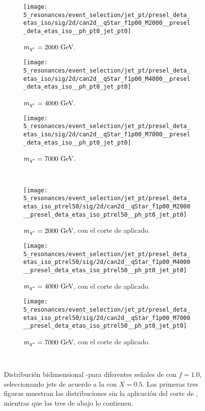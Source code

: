\begin{figure}[ht!]
    \centering
    \begin{subfigure}[h]{0.32\linewidth}
        \centering
        \texttt{[image: 5\_resonances/event\_selection/jet\_pt/presel\_deta\_etas\_iso/sig/2d/can2d\_\_qStar\_f1p00\_M2000\_\_presel\_deta\_etas\_iso\_\_ph\_pt0\_jet\_pt0]}
        \caption{\(m_{q^*}=2000~\text{GeV}\).}
    \end{subfigure}
    \hfill
    \begin{subfigure}[h]{0.32\linewidth}
        \centering
        \texttt{[image: 5\_resonances/event\_selection/jet\_pt/presel\_deta\_etas\_iso/sig/2d/can2d\_\_qStar\_f1p00\_M4000\_\_presel\_deta\_etas\_iso\_\_ph\_pt0\_jet\_pt0]}
        \caption{\(m_{q^*}=4000~\text{GeV}\).}
    \end{subfigure}
    \hfill
    \begin{subfigure}[h]{0.32\linewidth}
        \centering
        \texttt{[image: 5\_resonances/event\_selection/jet\_pt/presel\_deta\_etas\_iso/sig/2d/can2d\_\_qStar\_f1p00\_M7000\_\_presel\_deta\_etas\_iso\_\_ph\_pt0\_jet\_pt0]}
        \caption{\(m_{q^*}=7000~\text{GeV}\).}
    \end{subfigure}\\
    \begin{subfigure}[h]{0.32\linewidth}
        \centering
        \texttt{[image: 5\_resonances/event\_selection/jet\_pt/presel\_deta\_etas\_iso\_ptrel50/sig/2d/can2d\_\_qStar\_f1p00\_M2000\_\_presel\_deta\_etas\_iso\_ptrel50\_\_ph\_pt0\_jet\_pt0]}
        \caption{\(m_{q^*}=2000~\text{GeV}\), con el corte de \ptjet aplicado.}
    \end{subfigure}
    \hfill
    \begin{subfigure}[h]{0.32\linewidth}
        \centering
        \texttt{[image: 5\_resonances/event\_selection/jet\_pt/presel\_deta\_etas\_iso\_ptrel50/sig/2d/can2d\_\_qStar\_f1p00\_M4000\_\_presel\_deta\_etas\_iso\_ptrel50\_\_ph\_pt0\_jet\_pt0]}
        \caption{\(m_{q^*}=4000~\text{GeV}\), con el corte de \ptjet aplicado.}
    \end{subfigure}
    \hfill
    \begin{subfigure}[h]{0.32\linewidth}
        \centering
        \texttt{[image: 5\_resonances/event\_selection/jet\_pt/presel\_deta\_etas\_iso\_ptrel50/sig/2d/can2d\_\_qStar\_f1p00\_M7000\_\_presel\_deta\_etas\_iso\_ptrel50\_\_ph\_pt0\_jet\_pt0]}
        \caption{\(m_{q^*}=7000~\text{GeV}\), con el corte de \ptjet aplicado.}
    \end{subfigure}\\
    \caption{Distribución bidimensional \ptgam-\ptjet para diferentes señales de \qstar con \(f=1.0\), seleccionando jets de acuerdo a la \Eqn{\ref{eq:evt_selection:sr_opt:jet_pt:jet_pt_rel_X}} con \(X=0.5\). Las primeras tres figuras muestran las distribuciones sin la aplicación del corte de \ptjet, mientras que las tres de abajo lo contienen.}
    \label{fig:evt_selection:sr_opt:jet_pt:ptgam_ptjet_signals}
\end{figure}



